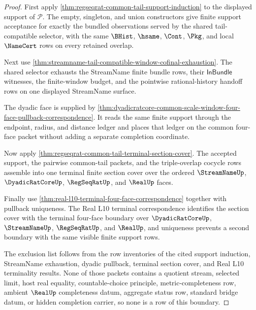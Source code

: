 \begin{proof}
First apply \autoref{thm:regseqrat-common-tail-support-induction} to the displayed support of $\mathcal P$. The empty, singleton, and union constructors give finite support acceptance for exactly the bundled observations served by the shared tail-compatible selector, with the same $\BHist$, $\hsame$, $\Cont$, $\Pkg$, and local $\NameCert$ rows on every retained overlap.

Next use \autoref{thm:streamname-tail-compatible-window-cofinal-exhaustion}. The shared selector exhausts the StreamName finite bundle rows, their $\mathsf{InBundle}$ witnesses, the finite-window budget, and the pointwise rational-history handoff rows on one displayed StreamName surface.

The dyadic face is supplied by \autoref{thm:dyadicratcore-common-scale-window-four-face-pullback-correspondence}. It reads the same finite support through the endpoint, radius, and distance ledger and places that ledger on the common four-face packet without adding a separate completion coordinate.

Now apply \autoref{thm:regseqrat-common-tail-terminal-section-cover}. The accepted support, the pairwise common-tail packets, and the triple-overlap cocycle rows assemble into one terminal finite section cover over the ordered $\StreamNameUp$, $\DyadicRatCoreUp$, $\RegSeqRatUp$, and $\RealUp$ faces.

Finally use \autoref{thm:real-l10-terminal-four-face-correspondence} together with pullback uniqueness. The Real L10 terminal correspondence identifies the section cover with the terminal four-face boundary over $\DyadicRatCoreUp$, $\StreamNameUp$, $\RegSeqRatUp$, and $\RealUp$, and uniqueness prevents a second boundary with the same visible finite support rows.

The exclusion list follows from the row inventories of the cited support induction, StreamName exhaustion, dyadic pullback, terminal section cover, and Real L10 terminality results. None of those packets contains a quotient stream, selected limit, host real equality, countable-choice principle, metric-completeness row, ambient $\RealUp$ completeness datum, aggregate status row, standard bridge datum, or hidden completion carrier, so none is a row of this boundary.
\end{proof}

